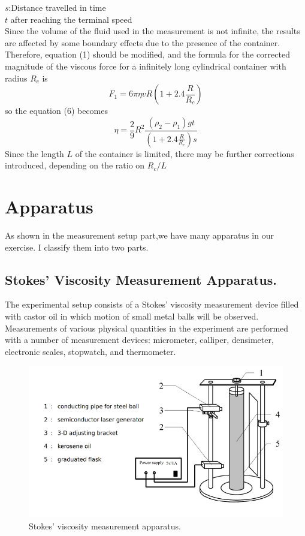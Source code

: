 \documentclass[12pt]{article}
\begin{document}
{\centering \footnotesize  $s$:Distance travelled in time \\$t$ after reaching the terminal speed\\
}
Since the volume of the fluid used in the measurement is not infinite, the results are
affected by some boundary effects due to the presence of the container. Therefore, equation (1) should be modified, and the formula for the corrected magnitude of the viscous force for a infinitely long cylindrical container with radius $R_c$ is
\begin{equation}
F_1=6\pi{\eta}vR(1+2.4\frac{R}{R_c})
\end{equation}
so the equation (6) becomes
\begin{equation}
\eta=\frac{2}{9}R^2\frac{(\rho_2-\rho_1)gt}{(1+2.4\frac{R}{R_c})s}
\end{equation}
Since the length $L$ of the container is limited, there may be further corrections introduced, depending on the ratio on $R_c/L$	
\section{Apparatus}
As shown in the measurement setup part,we have many apparatus in our exercise. I
classify them into two parts.
\subsection{Stokes' Viscosity Measurement Apparatus.}
 The experimental setup consists of a Stokes' viscosity measurement device filled with castor oil in which motion of small metal balls will be observed. Measurements of various physical quantities in the experiment are performed with a number of measurement devices: micrometer, calliper, densimeter, electronic scales, stopwatch, and thermometer.
\begin{figure}[H]
\centering
\includegraphics[scale=0.8]{P1.jpg}
\caption{Stokes' viscosity measurement apparatus.}
\end{figure}
\end{document}

